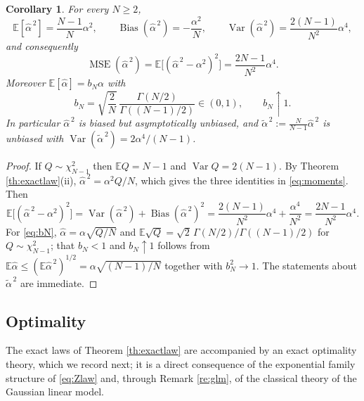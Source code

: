 \documentclass[11pt,reqno]{amsart}
\numberwithin{equation}{section}
\theoremstyle{plain}
\newtheorem{corollary}[theorem]{Corollary}
\theoremstyle{definition}
\theoremstyle{remark}
\newcommand{\E}{\mathbb{E}}
\DeclareMathOperator{\Var}{Var}
\DeclareMathOperator{\Bias}{Bias}
\DeclareMathOperator{\MSE}{MSE}
\begin{document}
\begin{corollary}\label{co:moments}
For every $N\ge2$,
\begin{equation}\label{eq:moments}
  \E[\widehat\alpha^{\,2}]=\frac{N-1}{N}\alpha^{2},\qquad
  \Bias(\widehat\alpha^{\,2})=-\frac{\alpha^{2}}{N},\qquad
  \Var(\widehat\alpha^{\,2})=\frac{2(N-1)}{N^{2}}\alpha^{4},
\end{equation}
and consequently
\begin{equation}\label{eq:mse}
  \MSE(\widehat\alpha^{\,2})
  =\E\bigl[(\widehat\alpha^{\,2}-\alpha^{2})^{2}\bigr]=\frac{2N-1}{N^{2}}\alpha^{4}.
\end{equation}
Moreover $\E[\widehat\alpha]=b_N\alpha$ with
\begin{equation}\label{eq:bN}
  b_N=\sqrt{\frac2N}\,\frac{\Gamma(N/2)}{\Gamma((N-1)/2)}\in(0,1),\qquad b_N\uparrow1 .
\end{equation}
In particular $\widehat\alpha^{\,2}$ is biased but asymptotically unbiased, and
$\widetilde\alpha^{\,2}:=\frac{N}{N-1}\widehat\alpha^{\,2}$ is unbiased with
$\Var(\widetilde\alpha^{\,2})=2\alpha^{4}/(N-1)$.
\end{corollary}

\begin{proof}
If $Q\sim\chi^{2}_{N-1}$ then $\E Q=N-1$ and $\Var Q=2(N-1)$. By Theorem
\ref{th:exactlaw}(ii), $\widehat\alpha^{\,2}=\alpha^{2}Q/N$, which gives the three
identities in \eqref{eq:moments}. Then
\[
  \E\bigl[(\widehat\alpha^{\,2}-\alpha^{2})^{2}\bigr]
  =\Var(\widehat\alpha^{\,2})+\Bias(\widehat\alpha^{\,2})^{2}
  =\frac{2(N-1)}{N^{2}}\alpha^{4}+\frac{\alpha^{4}}{N^{2}}
  =\frac{2N-1}{N^{2}}\alpha^{4}.
\]
For \eqref{eq:bN}, $\widehat\alpha=\alpha\sqrt{Q/N}$ and
$\E\sqrt Q=\sqrt2\,\Gamma(N/2)/\Gamma((N-1)/2)$ for $Q\sim\chi^{2}_{N-1}$; that $b_N<1$
and $b_N\uparrow1$ follows from $\E\widehat\alpha\le(\E\widehat\alpha^{\,2})^{1/2}
=\alpha\sqrt{(N-1)/N}$ together with $b_N^{2}\to1$. The statements about
$\widetilde\alpha^{\,2}$ are immediate.
\end{proof}

\subsection{Optimality}

The exact laws of Theorem \ref{th:exactlaw} are accompanied by an exact optimality
theory, which we record next; it is a direct consequence of the exponential family
structure of \eqref{eq:Zlaw} and, through Remark \ref{re:glm}, of the classical theory of
the Gaussian linear model.
\end{document}
